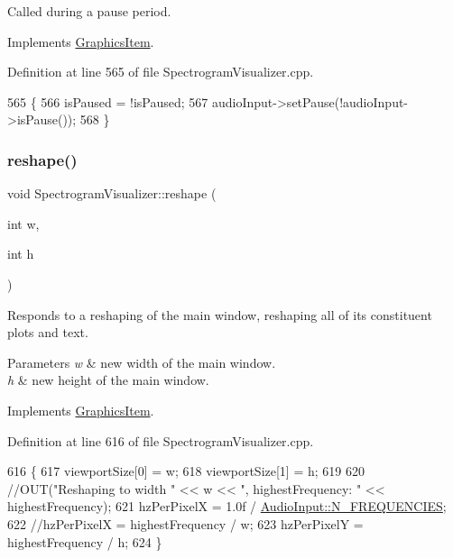 Called during a pause period. 

Implements \mbox{\hyperlink{classGraphicsItem}{Graphics\+Item}}.



Definition at line 565 of file Spectrogram\+Visualizer.\+cpp.


\begin{DoxyCode}
565                                   \{
566     isPaused = !isPaused;
567     audioInput->setPause(!audioInput->isPause());
568 \}
\end{DoxyCode}
\mbox{\label{structSpectrogramVisualizer_a789c6b59ab3a6960056eaab014163b91}} 
\subsubsection{\texorpdfstring{reshape()}{reshape()}}
{\footnotesize\ttfamily void Spectrogram\+Visualizer\+::reshape (\begin{DoxyParamCaption}\item[{int}]{w,  }\item[{int}]{h }\end{DoxyParamCaption})\hspace{0.3cm}{\ttfamily [virtual]}}

Responds to a reshaping of the main window, reshaping all of its constituent plots and text. 
\begin{DoxyParams}{Parameters}
{\em w} & new width of the main window. \\
\hline
{\em h} & new height of the main window. \\
\hline
\end{DoxyParams}


Implements \mbox{\hyperlink{classGraphicsItem}{Graphics\+Item}}.



Definition at line 616 of file Spectrogram\+Visualizer.\+cpp.


\begin{DoxyCode}
616                                                 \{
617     viewportSize[0] = w;
618     viewportSize[1] = h;
619 
620     \textcolor{comment}{//OUT("Reshaping to width " << w << ", highestFrequency: " << highestFrequency);}
621     hzPerPixelX = 1.0f / \mbox{\hyperlink{classAudioInput_a4be6c19fca6626b2ccee1eeca458f7c8}{AudioInput::N\_FREQUENCIES}};
622     \textcolor{comment}{//hzPerPixelX = highestFrequency / w;}
623     hzPerPixelY = highestFrequency / h;
624 \}
\end{DoxyCode}
\mbox{\label{structSpectrogramVisualizer_a631d3522ef8d8bdc6fd9ba9acf2f15ec}} 
